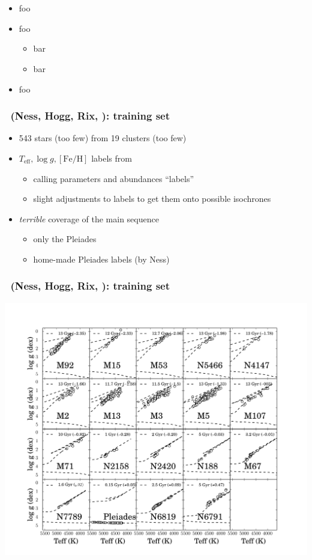 \documentclass[pdftex]{beamer}
\begin{document}
\begin{frame}
  \frametitle{\sdssiii\ \apogee}
  \begin{itemize}
  \item foo
  \item foo
    \begin{itemize}
    \item bar
    \item bar
    \end{itemize}
  \item foo
  \end{itemize}
\end{frame}

\newcommand{\credits}{{\footnotesize (Ness, Hogg, Rix, \etal)}}
\newcommand{\teff}{T_{\mathrm{eff}}}
\newcommand{\logg}{\log g}
\newcommand{\feh}{[\mathrm{Fe / H}]}

\begin{frame}
  \frametitle{\tc\ \credits: training set}
  \begin{itemize}
  \item 543 stars (too few) from 19 clusters (too few)
  \item $\teff, \logg, \feh$ labels from \apogee
    \begin{itemize}
    \item calling parameters and abundances ``labels''
    \item slight adjustments to labels to get them onto possible isochrones
    \end{itemize}
  \item \emph{terrible} coverage of the main sequence
    \begin{itemize}
    \item only the Pleiades
    \item home-made Pleiades labels (by Ness)
    \end{itemize}
  \end{itemize}
\end{frame}

\begin{frame}
  \frametitle{\tc\ \credits: training set}
  \includegraphics[height=0.9\textheight]{../documents/plots/training_aspcap2.pdf}
\end{frame}
\end{document}
